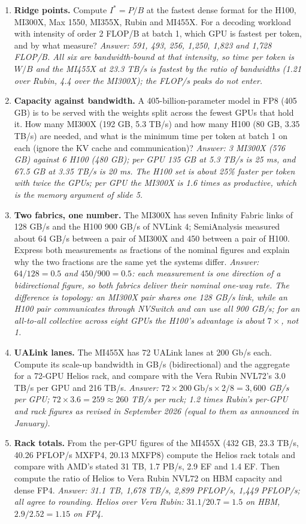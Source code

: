 \documentclass[11pt,letterpaper]{article}
\begin{document}
\begin{enumerate}[leftmargin=1.6em,itemsep=6pt]
\item \textbf{Ridge points.} Compute $I^\ast = P/B$ at the fastest dense format for the H100, MI300X, Max 1550, MI355X, Rubin and MI455X. For a decoding workload with intensity of order 2 FLOP/B at batch 1, which GPU is fastest per token, and by what measure? \emph{Answer: 591, 493, 256, 1,250, 1,823 and 1,728 FLOP/B. All six are bandwidth-bound at that intensity, so time per token is $W/B$ and the MI455X at 23.3 TB/s is fastest by the ratio of bandwidths (1.21 over Rubin, 4.4 over the MI300X); the FLOP/s peaks do not enter.}
\item \textbf{Capacity against bandwidth.} A 405-billion-parameter model in FP8 (405 GB) is to be served with the weights split across the fewest GPUs that hold it. How many MI300X (192 GB, 5.3 TB/s) and how many H100 (80 GB, 3.35 TB/s) are needed, and what is the minimum time per token at batch 1 on each (ignore the KV cache and communication)? \emph{Answer: 3 MI300X (576 GB) against 6 H100 (480 GB); per GPU 135 GB at 5.3 TB/s is 25 ms, and 67.5 GB at 3.35 TB/s is 20 ms. The H100 set is about 25\% faster per token with twice the GPUs; per GPU the MI300X is 1.6 times as productive, which is the memory argument of slide 5.}
\item \textbf{Two fabrics, one number.} The MI300X has seven Infinity Fabric links of 128 GB/s and the H100 900 GB/s of NVLink 4; SemiAnalysis measured about 64 GB/s between a pair of MI300X and 450 between a pair of H100. Express both measurements as fractions of the nominal figures and explain why the two fractions are the same yet the systems differ. \emph{Answer: $64/128 = 0.5$ and $450/900 = 0.5$: each measurement is one direction of a bidirectional figure, so both fabrics deliver their nominal one-way rate. The difference is topology: an MI300X pair shares one 128 GB/s link, while an H100 pair communicates through NVSwitch and can use all 900 GB/s; for an all-to-all collective across eight GPUs the H100's advantage is about $7\times$, not 1.}
\item \textbf{UALink lanes.} The MI455X has 72 UALink lanes at 200 Gb/s each. Compute its scale-up bandwidth in GB/s (bidirectional) and the aggregate for a 72-GPU Helios rack, and compare with the Vera Rubin NVL72's 3.0 TB/s per GPU and 216 TB/s. \emph{Answer: $72\times 200\ \mathrm{Gb/s}\times 2/8 = 3{,}600$ GB/s per GPU; $72\times 3.6 = 259 \approx 260$ TB/s per rack; 1.2 times Rubin's per-GPU and rack figures as revised in September 2026 (equal to them as announced in January).}
\item \textbf{Rack totals.} From the per-GPU figures of the MI455X (432 GB, 23.3 TB/s, 40.26 PFLOP/s MXFP4, 20.13 MXFP8) compute the Helios rack totals and compare with AMD's stated 31 TB, 1.7 PB/s, 2.9 EF and 1.4 EF. Then compute the ratio of Helios to Vera Rubin NVL72 on HBM capacity and dense FP4. \emph{Answer: 31.1 TB, 1,678 TB/s, 2,899 PFLOP/s, 1,449 PFLOP/s; all agree to rounding. Helios over Vera Rubin: $31.1/20.7 = 1.5$ on HBM, $2.9/2.52 = 1.15$ on FP4.}

\end{enumerate}
\end{document}
